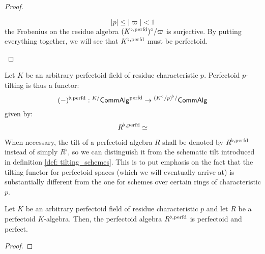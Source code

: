 \begin{proof}
\begin{itemize}
                                    $$|p| \leq |\varpi| < 1$$
                                the Frobenius on the residue algebra $(K^{\flat, \mathrm{perfd}})^{\circ}/\varpi$ is surjective. By putting everything together, we will see that $K^{\flat, \mathrm{perfd}}$ must be perfectoid.
                            \end{itemize}
                    \end{proof}
            
                \begin{definition} \label{def: perfectoid_tilting}
                    Let $K$ be an arbitrary perfectoid field of residue characteristic $p$. Perfectoid $p$-tilting is thus a functor:
                        $$(-)^{\flat, \mathrm{perfd}}: {}^{K/}\mathsf{Comm}\mathsf{Alg}^{\mathrm{perfd}} \to {}^{(K^{\circ}/p)^{\flat}/}\mathsf{Comm}\mathsf{Alg}$$
                    given by:
                        $$R^{\flat, \mathrm{perfd}} \simeq $$
                \end{definition}
                \begin{convention} \label{conv: tilted_perfectoids_notations}
                    When necessary, the tilt of a perfectoid algebra $R$ shall be denoted by $R^{\flat, \mathrm{perfd}}$ instead of simply $R^{\flat}$, so we can distinguish it from the schematic tilt introduced in definition \ref{def: tilting_schemes}. This is to put emphasis on the fact that the tilting functor for perfectoid spaces (which we will eventually arrive at) is substantially different from the one for schemes over certain rings of characteristic $p$. 
                \end{convention}
                \begin{proposition} \label{prop: tilted_perfectoid_algebras_are_perfect}
                    Let $K$ be an arbitrary perfectoid field of residue characteristic $p$ and let $R$ be a perfectoid $K$-algebra. Then, the perfectoid algebra $R^{\flat, \mathrm{perfd}}$ is perfectoid and perfect.
                \end{proposition}
                    \begin{proof}
                        
                    \end{proof}
